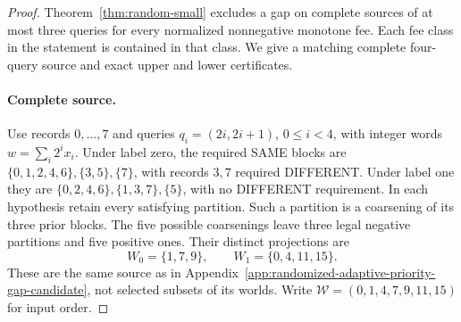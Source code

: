 \begin{proof}
Theorem~\ref{thm:random-small} excludes a gap on complete sources of at
most three queries for every normalized nonnegative monotone fee. Each
fee class in the statement is contained in that class. We give a matching
complete four-query source and exact upper and lower certificates.

\paragraph*{Complete source.}
Use records $0,\ldots,7$ and queries $q_i=(2i,2i+1)$, $0\leq i<4$,
with integer words $w=\sum_i2^ix_i$. Under label zero, the required
SAME blocks are $\{0,1,2,4,6\},\{3,5\},\{7\}$, with records $3,7$
required DIFFERENT. Under label one they are
$\{0,2,4,6\},\{1,3,7\},\{5\}$, with no DIFFERENT requirement.
In each hypothesis retain every satisfying partition. Such a partition
is a coarsening of its three prior blocks. The five possible coarsenings
leave three legal negative partitions and five positive ones. Their
distinct projections are
\[
 W_0=\{1,7,9\},\qquad W_1=\{0,4,11,15\}.
\]
These are the same source as in
Appendix~\ref{app:randomized-adaptive-priority-gap-candidate}, not selected
subsets of its worlds. Write $\mathcal W=(0,1,4,7,9,11,15)$ for input order.


\end{proof}
